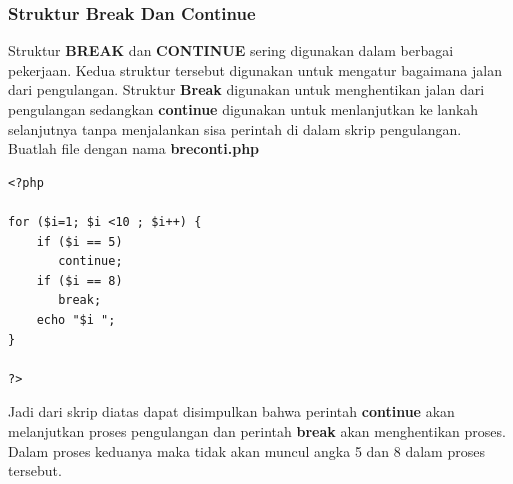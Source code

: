 \subsubsection{Struktur Break Dan Continue}
Struktur \textbf{BREAK} dan \textbf{CONTINUE} sering digunakan dalam berbagai pekerjaan. Kedua struktur tersebut digunakan untuk mengatur bagaimana jalan dari pengulangan. Struktur \textbf{Break} digunakan untuk menghentikan jalan dari pengulangan sedangkan \textbf{continue} digunakan untuk menlanjutkan ke lankah selanjutnya tanpa menjalankan sisa perintah di dalam skrip pengulangan. Buatlah file dengan nama \textbf{breconti.php}
\begin{lstlisting}
<?php
 
for ($i=1; $i <10 ; $i++) {
    if ($i == 5)
       continue;
    if ($i == 8)
       break;
    echo "$i ";
}
 
?>
\end{lstlisting}
Jadi dari skrip diatas dapat disimpulkan bahwa perintah  \textbf{continue} akan melanjutkan proses pengulangan dan perintah \textbf{break} akan menghentikan proses. Dalam proses keduanya maka tidak akan muncul angka 5 dan 8 dalam proses tersebut.

